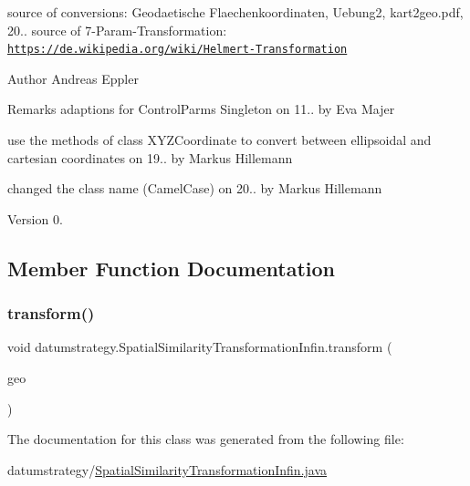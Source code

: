 source of conversions\+: Geodaetische Flaechenkoordinaten, Uebung2, kart2geo.\+pdf, 20.. source of 7-\/\+Param-\/\+Transformation\+: \href{https://de.wikipedia.org/wiki/Helmert-Transformation}{\tt https\+://de.\+wikipedia.\+org/wiki/\+Helmert-\/\+Transformation} \begin{DoxyAuthor}{Author}
Andreas Eppler 
\end{DoxyAuthor}
\begin{DoxyRemark}{Remarks}
adaptions for Control\+Parms Singleton on 11.. by Eva Majer 

use the methods of class X\+Y\+Z\+Coordinate to convert between ellipsoidal and cartesian coordinates on 19.. by Markus Hillemann 

changed the class name (Camel\+Case) on 20.. by Markus Hillemann 
\end{DoxyRemark}
\begin{DoxyVersion}{Version}
0. 
\end{DoxyVersion}


\subsection{Member Function Documentation}
\mbox{\label{classdatumstrategy_1_1_spatial_similarity_transformation_infin_a10a133bbcba0dec7e7bdff6a430087b5}} 
\subsubsection{\texorpdfstring{transform()}{transform()}}
{\footnotesize\ttfamily void datumstrategy.\+Spatial\+Similarity\+Transformation\+Infin.\+transform (\begin{DoxyParamCaption}\item[{\hyperlink{classcoordinates_1_1_geographic_coordinate_interface}{Geographic\+Coordinate\+Interface}}]{geo }\end{DoxyParamCaption})}



The documentation for this class was generated from the following file\+:\begin{DoxyCompactItemize}
\item 
datumstrategy/\hyperlink{_spatial_similarity_transformation_infin_8java}{Spatial\+Similarity\+Transformation\+Infin.\+java}\end{DoxyCompactItemize}
